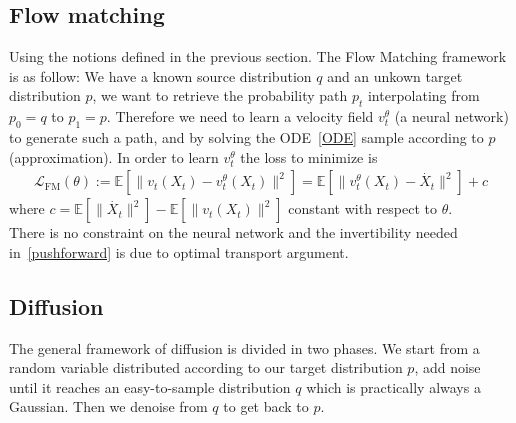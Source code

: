\documentclass{article}
\begin{document}
\begin{comment}
\subsection{Continuous normalizing flow}

In continuous normalizing flow framework, \(f\) is obtained using a continuous dynamic 
\begin{align}
    \frac{\partial x_0}{\partial t} = f(x_t,t)
\end{align}
In continuous normalizing flows, \(f\) is obtzined by solving the neural ODE 
\begin{align}
    x_T = x_0+\int_0^T f(x_t,t)^{\theta} dt
\end{align}

CNF are trained by maximizing the log-likelyhood 
\begin{align}
    \mathcal{L}(\theta) = \mathbb{E}[\log p(x)]
\end{align}
\end{comment}

\subsection{Flow matching}

Using the notions defined in the previous section. The Flow Matching framework is as follow: 
We have a known source distribution \(q\) and an unkown target distribution \(p\), we want to retrieve the probability path \(p_t\) interpolating from \(p_0=q\) to \(p_1=p\). Therefore we need to learn a velocity field \(v_t^\theta\) (a neural network) to generate such a path, and by solving the ODE~\ref{ODE} sample according to \(p\) (approximation). In order to learn \(v_t^\theta\) the loss to minimize is 
\begin{align}
    \mathcal{L}_\text{FM}(\theta):=\mathbb{E}[\|v_t(X_t)-v_t^\theta(X_t)\|^2]= \mathbb{E}[\|v_t^\theta(X_t)-\dot{X_t}\|^2] + c
\end{align} 
where \(c = \mathbb{E}[\|\dot{X_t}\|^2]-\mathbb{E}[\|v_t(X_t)\|^2]\) constant with respect to \(\theta\). \\
There is no constraint on the neural network and the invertibility needed in~\ref{pushforward} is due to optimal transport argument.

\subsection{Diffusion}
The general framework of diffusion is divided in two phases. We start from a random variable distributed according to our target distribution \( p \), add noise until it reaches an easy-to-sample distribution \(q\) which is practically always a Gaussian. Then we denoise from \(q\) to get back to \(p\). 
\end{document}
